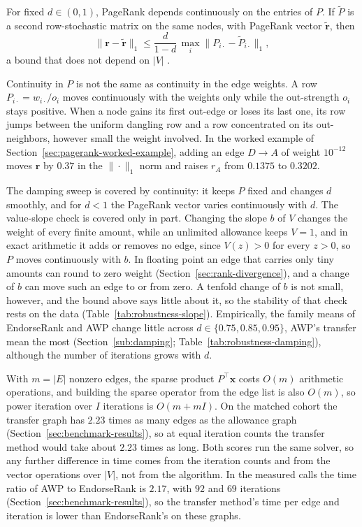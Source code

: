 
For fixed $d\in(0,1)$, PageRank depends continuously on the entries of $P$. If $\tilde P$ is a second row-stochastic matrix on the same nodes, with PageRank vector $\tilde{\mathbf{r}}$, then
\[
\|\mathbf{r}-\tilde{\mathbf{r}}\|_1\le\frac{d}{1-d}\,\max_i\bigl\|P_{i\cdot}-\tilde P_{i\cdot}\bigr\|_1,
\]
a bound that does not depend on $|V|$ \parencite{langville2006pagerank}.

Continuity in $P$ is not the same as continuity in the edge weights. A row $P_{i\cdot}=w_{i\cdot}/o_i$ moves continuously with the weights only while the out-strength $o_i$ stays positive. When a node gains its first out-edge or loses its last one, its row jumps between the uniform dangling row and a row concentrated on its out-neighbors, however small the weight involved. In the worked example of Section~\ref{sec:pagerank-worked-example}, adding an edge $D\to A$ of weight $10^{-12}$ moves $\mathbf{r}$ by $0.37$ in the $\|\cdot\|_1$ norm and raises $r_A$ from $0.1375$ to $0.3202$.

The damping sweep is covered by continuity: it keeps $P$ fixed and changes $d$ smoothly, and for $d<1$ the PageRank vector varies continuously with $d$. The value-slope check is covered only in part. Changing the slope $b$ of $V$ changes the weight of every finite amount, while an unlimited allowance keeps $V=1$, and in exact arithmetic it adds or removes no edge, since $V(z)>0$ for every $z>0$, so $P$ moves continuously with $b$. In floating point an edge that carries only tiny amounts can round to zero weight (Section~\ref{sec:rank-divergence}), and a change of $b$ can move such an edge to or from zero. A tenfold change of $b$ is not small, however, and the bound above says little about it, so the stability of that check rests on the data (Table~\ref{tab:robustness-slope}). Empirically, the family means of EndorseRank and AWP change little across $d\in\{0.75,0.85,0.95\}$, AWP's transfer mean the most (Section~\ref{sub:damping}; Table~\ref{tab:robustness-damping}), although the number of iterations grows with $d$.


With $m=|E|$ nonzero edges, the sparse product $P^{\top}\mathbf{x}$ costs $O(m)$ arithmetic operations, and building the sparse operator from the edge list is also $O(m)$, so power iteration over $I$ iterations is $O(m+mI)$. On the matched cohort the transfer graph has $2.23$ times as many edges as the allowance graph (Section~\ref{sec:benchmark-results}), so at equal iteration counts the transfer method would take about $2.23$ times as long. Both scores run the same solver, so any further difference in time comes from the iteration counts and from the vector operations over $|V|$, not from the algorithm. In the measured calls the time ratio of AWP to EndorseRank is $2.17$, with $92$ and $69$ iterations (Section~\ref{sec:benchmark-results}), so the transfer method's time per edge and iteration is lower than EndorseRank's on these graphs.

